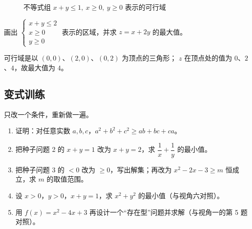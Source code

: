 \begin{explore}
\begin{figure}[htbp]
  \centering
  \caption{不等式组 $x+y\leq1,\ x\geq0,\ y\geq0$ 表示的可行域}
\end{figure}

\begin{problem}
画出 $\begin{cases}x+y\leq2\\ x\geq0\\ y\geq0\end{cases}$ 表示的区域，并求 $z=x+2y$ 的最大值。
\end{problem}
\begin{solution}
可行域是以 $(0,0)$、$(2,0)$、$(0,2)$ 为顶点的三角形；
$z$ 在顶点处的值为 $0$、$2$、$4$，故最大值为 $4$。
\end{solution}

\end{explore}

\begin{inclasstest}
\subsection{变式训练}
只改一个条件，重新做一遍。
\begin{enumerate}
  \item 证明：对任意实数 $a,b,c$，$a^2+b^2+c^2\geq ab+bc+ca$。
  \item 把种子问题 2 的 $x+y=1$ 改为 $x+y=2$，求 $\dfrac1x+\dfrac1y$ 的最小值。
  \item 把种子问题 3 的 $<0$ 改为 $\geq0$，写出解集；再改为 $x^2-2x-3\geq m$ 恒成立，求 $m$ 的取值范围。
  \item 设 $x>0$，$y>0$，$x+y=1$，求 $x^2+y^2$ 的最小值（与视角六对照）。
  \item 用 $f(x)=x^2-4x+3$ 再设计一个“存在型”问题并求解（与视角一的第 5 题对照）。
\end{enumerate}
\end{inclasstest}

